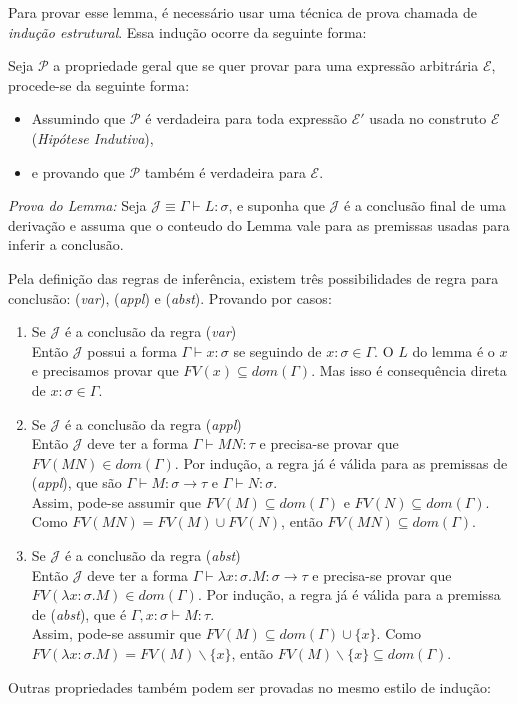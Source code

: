 \documentclass[../main.tex]{subfiles}
\begin{document}
Para provar esse lemma, é necessário usar uma técnica de prova chamada de \emph{indução estrutural}. Essa indução ocorre da seguinte forma:

Seja $\mathcal{P}$ a propriedade geral que se quer provar para uma expressão arbitrária $\mathcal{E}$, procede-se da seguinte forma:

\begin{itemize}
    \item Assumindo que $\mathcal{P}$ é verdadeira para toda expressão $\mathcal{E}'$ usada no construto $\mathcal{E}$ (\emph{Hipótese Indutiva}),
    \item e provando que $\mathcal{P}$ também é verdadeira para $\mathcal{E}$.
\end{itemize}

\emph{Prova do Lemma:} Seja $\mathcal{J} \equiv \Gamma \vdash L : \sigma$, e suponha que $\mathcal{J}$ é a conclusão final de uma derivação e assuma que o conteudo do Lemma vale para as premissas usadas para inferir a conclusão.

Pela definição das regras de inferência, existem três possibilidades de regra para conclusão: (\emph{var}), (\emph{appl}) e (\emph{abst}). Provando por casos:

\begin{enumerate}
    \item Se $\mathcal{J}$ é a conclusão da regra (\emph{var}) \\
    Então $\mathcal{J}$ possui a forma $\Gamma \vdash x : \sigma$ se seguindo de $x : \sigma \in \Gamma$. O $L$ do lemma é o $x$ e precisamos provar que $FV(x) \subseteq dom(\Gamma)$. Mas isso é consequência direta de $x : \sigma \in \Gamma$.
    \item Se $\mathcal{J}$ é a conclusão da regra (\emph{appl}) \\
    Então $\mathcal{J}$ deve ter a forma $\Gamma \vdash MN : \tau$ e precisa-se provar que $FV(MN) \in dom(\Gamma)$. Por indução, a regra já é válida para as premissas de (\emph{appl}), que são $\Gamma \vdash M : \sigma \to \tau$ e $\Gamma \vdash N : \sigma$. \\
    Assim, pode-se assumir que $FV(M) \subseteq dom(\Gamma)$ e $FV(N) \subseteq dom(\Gamma)$. Como $FV(MN) = FV(M) \cup FV(N)$, então $FV(MN) \subseteq dom(\Gamma)$.
    \item Se $\mathcal{J}$ é a conclusão da regra (\emph{abst}) \\
    Então $\mathcal{J}$ deve ter a forma $\Gamma \vdash \lambda x : \sigma . M : \sigma \to \tau$ e precisa-se provar que $FV(\lambda x : \sigma . M) \in dom(\Gamma)$. Por indução, a regra já é válida para a premissa de (\emph{abst}), que é $\Gamma, x : \sigma \vdash M : \tau$. \\
    Assim, pode-se assumir que $FV(M) \subseteq dom(\Gamma) \cup \{ x \}$. Como $FV(\lambda x : \sigma . M) = FV(M) \backslash \{ x \}$, então $FV(M) \backslash \{ x \} \subseteq dom(\Gamma)$.
\end{enumerate}
\hfill Outras propriedades também podem ser provadas no mesmo estilo de indução:
\end{document}
